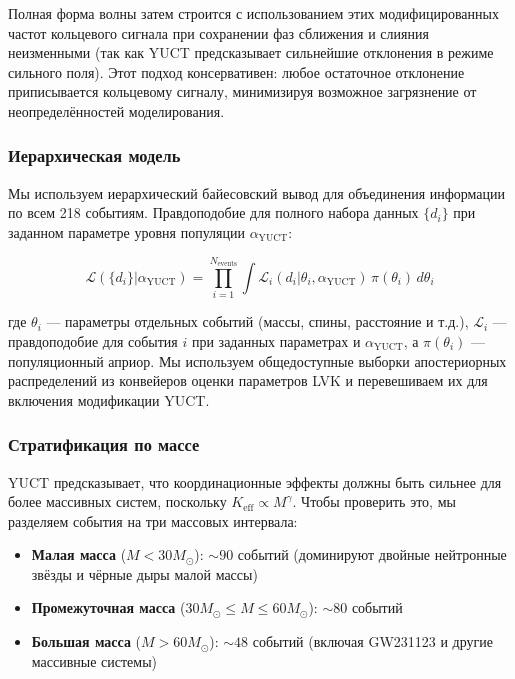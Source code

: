 \documentclass[12pt,a4paper]{article}
\theoremstyle{remark}
\newcommand{\Keff}{K_{\mathrm{eff}}}
\begin{document}
	Полная форма волны затем строится с использованием этих модифицированных частот кольцевого сигнала при сохранении фаз сближения и слияния неизменными (так как YUCT предсказывает сильнейшие отклонения в режиме сильного поля). Этот подход консервативен: любое остаточное отклонение приписывается кольцевому сигналу, минимизируя возможное загрязнение от неопределённостей моделирования.
	
	\subsubsection{Иерархическая модель}
	
	Мы используем иерархический байесовский вывод для объединения информации по всем 218 событиям. Правдоподобие для полного набора данных $\{d_i\}$ при заданном параметре уровня популяции $\alpha_{\text{YUCT}}$:
	
	\begin{equation}
		\mathcal{L}(\{d_i\} | \alpha_{\text{YUCT}}) = \prod_{i=1}^{N_{\text{events}}} \int \mathcal{L}_i(d_i | \theta_i, \alpha_{\text{YUCT}}) \, \pi(\theta_i) \, d\theta_i
		\label{eq:hierarchical}
	\end{equation}
	
	где $\theta_i$ — параметры отдельных событий (массы, спины, расстояние и т.д.), $\mathcal{L}_i$ — правдоподобие для события $i$ при заданных параметрах и $\alpha_{\text{YUCT}}$, а $\pi(\theta_i)$ — популяционный априор. Мы используем общедоступные выборки апостериорных распределений из конвейеров оценки параметров LVK и перевешиваем их для включения модификации YUCT.
	
	\subsubsection{Стратификация по массе}
	
	YUCT предсказывает, что координационные эффекты должны быть сильнее для более массивных систем, поскольку $\Keff \propto M^{\gamma}$. Чтобы проверить это, мы разделяем события на три массовых интервала:
	
	\begin{itemize}
		\item \textbf{Малая масса} ($M < 30 M_\odot$): $\sim 90$ событий (доминируют двойные нейтронные звёзды и чёрные дыры малой массы)
		\item \textbf{Промежуточная масса} ($30 M_\odot \le M \le 60 M_\odot$): $\sim 80$ событий
		\item \textbf{Большая масса} ($M > 60 M_\odot$): $\sim 48$ событий (включая GW231123 и другие массивные системы)
	\end{itemize}
	
\end{document}
